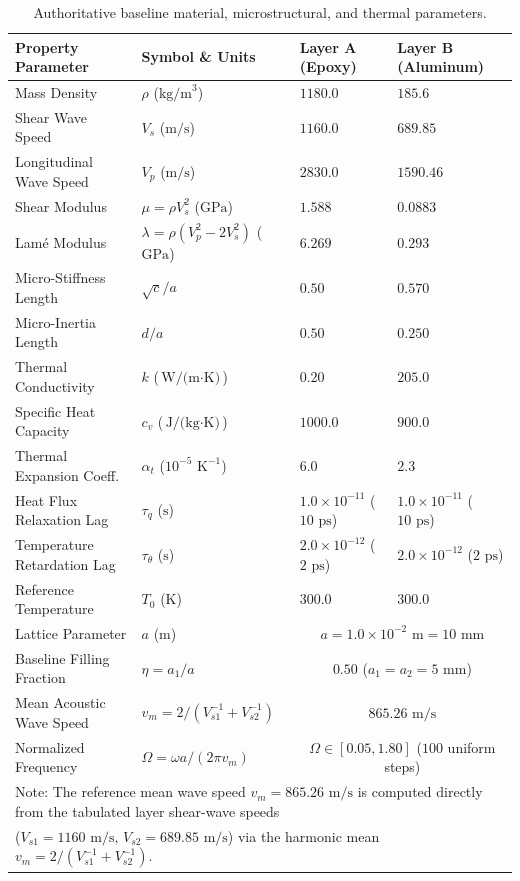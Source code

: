\documentclass[11pt,a4paper]{article}
\begin{document}
\begin{table}[htbp]
\centering
\caption{Authoritative baseline material, microstructural, and thermal parameters.}
\label{tab:parameters}
\small
\begin{tabular*}{\textwidth}{@{\extracolsep{\fill}}llll@{}}
\toprule
Property Parameter & Symbol \& Units & Layer A (Epoxy) & Layer B (Aluminum) \\
\midrule
Mass Density & $\rho$ ($\text{kg/m}^3$) & $1180.0$ & $185.6$ \\
Shear Wave Speed & $V_s$ ($\text{m/s}$) & $1160.0$ & $689.85$ \\
Longitudinal Wave Speed & $V_p$ ($\text{m/s}$) & $2830.0$ & $1590.46$ \\
Shear Modulus & $\mu = \rho V_s^2$ ($\text{GPa}$) & $1.588$ & $0.0883$ \\
Lam\'e Modulus & $\lambda = \rho(V_p^2 - 2V_s^2)$ ($\text{GPa}$) & $6.269$ & $0.293$ \\
Micro-Stiffness Length & $\sqrt{c}/a$ & $0.50$ & $0.570$ \\
Micro-Inertia Length & $d/a$ & $0.50$ & $0.250$ \\
Thermal Conductivity & $k$ ($\text{W/(m}\cdot\text{K)}$) & $0.20$ & $205.0$ \\
Specific Heat Capacity & $c_v$ ($\text{J/(kg}\cdot\text{K)}$) & $1000.0$ & $900.0$ \\
Thermal Expansion Coeff. & $\alpha_t$ ($10^{-5}\text{ K}^{-1}$) & $6.0$ & $2.3$ \\
Heat Flux Relaxation Lag & $\tau_q$ ($\text{s}$) & $1.0 \times 10^{-11}$ ($10\text{ ps}$) & $1.0 \times 10^{-11}$ ($10\text{ ps}$) \\
Temperature Retardation Lag & $\tau_\theta$ ($\text{s}$) & $2.0 \times 10^{-12}$ ($2\text{ ps}$) & $2.0 \times 10^{-12}$ ($2\text{ ps}$) \\
Reference Temperature & $T_0$ ($\text{K}$) & $300.0$ & $300.0$ \\
Lattice Parameter & $a$ ($\text{m}$) & \multicolumn{2}{c}{$a = 1.0 \times 10^{-2}\text{ m} = 10\text{ mm}$} \\
Baseline Filling Fraction & $\eta = a_1/a$ & \multicolumn{2}{c}{$0.50$ ($a_1 = a_2 = 5\text{ mm}$)} \\
Mean Acoustic Wave Speed & $v_m = 2/(V_{s1}^{-1} + V_{s2}^{-1})$ & \multicolumn{2}{c}{$865.26\text{ m/s}$} \\
Normalized Frequency & $\Omega = \omega a / (2\pi v_m)$ & \multicolumn{2}{c}{$\Omega \in [0.05, 1.80]$ ($100$ uniform steps)} \\
\midrule
\multicolumn{4}{l}{\footnotesize Note: The reference mean wave speed $v_m = 865.26\text{ m/s}$ is computed directly from the tabulated layer shear-wave speeds} \\
\multicolumn{4}{l}{\footnotesize ($V_{s1} = 1160\text{ m/s}$, $V_{s2} = 689.85\text{ m/s}$) via the harmonic mean $v_m = 2/(V_{s1}^{-1} + V_{s2}^{-1})$.} \\
\bottomrule
\end{tabular*}
\end{table}
\end{document}
